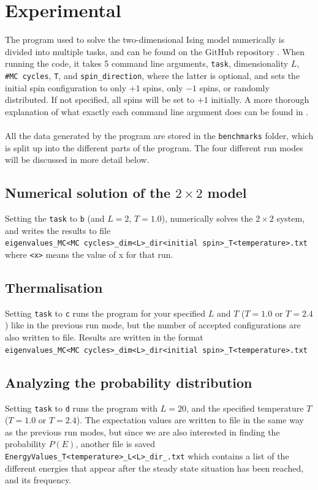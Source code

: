 \documentclass{article}
\begin{document}
\section{Experimental}
The program used to solve the two-dimensional Ising model numerically is divided into multiple tasks, and can be found on the GitHub repository \cite{cite:github}. When running the code, it takes 5 command line arguments, \texttt{task}, dimensionality $L$, \texttt{\#MC cycles}, \texttt{T}, and \texttt{spin\_direction}, where the latter is optional, and sets the initial spin configuration to only $+1$ spins, only $-1$ spins, or randomly distributed. If not specified, all spins will be set to $+1$ initially. A more thorough explanation of what exactly each command line argument does can be found in \cite{cite:github}.\\\\
All the data generated by the program are stored in the \texttt{benchmarks} folder, which is split up into the different parts of the program. The four different run modes will be discussed in more detail below.
\subsection{Numerical solution of the $2\times2$ model}
Setting the \texttt{task} to \texttt{b} (and $L = 2$, $T=1.0$), numerically solves the $2\times2$ system, and writes the results to file\\
\texttt{eigenvalues\_MC<MC cycles>\_dim<L>\_dir<initial spin>\_T<temperature>.txt}
where \texttt{<x>} means the value of x for that run.
\subsection{Thermalisation}
Setting \texttt{task} to \texttt{c} runs the program for your specified $L$ and $T$ ($T = 1.0$ or $T=2.4$) like in the previous run mode, but the number of accepted configurations are also written to file. Results are written in the format\\
\texttt{eigenvalues\_MC<MC cycles>\_dim<L>\_dir<initial spin>\_T<temperature>.txt}
\subsection{Analyzing the probability distribution}
Setting \texttt{task} to \texttt{d} runs the program with $L = 20$, and the specified temperature $T$ ($T = 1.0$ or $T=2.4$). The expectation values are written to file in the same way as the previous run modes, but since we are also interested in finding the probability $P(E)$, another file is saved\\
\texttt{EnergyValues\_T<temperature>\_L<L>\_dir\_<initial spin>.txt}
which contains a list of the different energies that appear after the steady state situation has been reached, and its frequency. 
\end{document}
